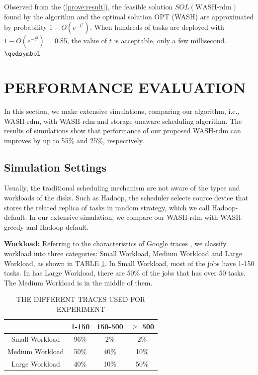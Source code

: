 \documentclass[conference]{IEEEtran}
\begin{document}
Observed from the (\ref{prove:result}), the feasible solution $SOL(\text{WASH-rdm})$ found by the algorithm and the optimal solution OPT (WASH) are approximated by probability $1 - O(e^{-t^2})$. When hundreds of tasks are deployed with $1 - O(e^{-t^2})$ = 0.85, the value of $t$ is acceptable, only a few millisecond.\hfill $\qedsymbol$

\section{PERFORMANCE EVALUATION}\label{PERFORMANCE_EVALUATION}

In this section, we make extensive simulations, comparing our algorithm, i.e., WASH-rdm, with WASH-rdm and storage-unaware scheduling algorithm. The results of simulations show that performance of our proposed WASH-rdm can improves by up to 55\% and 25\%, respectively.
\subsection{Simulation Settings}\label{SCM}
Usually, the traditional scheduling mechanism are not aware of the types and workloads of the disks. Such as Hadoop, the scheduler selects source device that stores the related replica of tasks in random strategy, which we call Hadoop-default. In our extensive simulation, we compare our WASH-rdm with WASH-greedy and Hadoop-default.

\textbf{Workload:} Referring to the characteristics of Google traces \cite{b20}, we classify workload into three categories: Small Workload, Medium Workload and Large Workload, as shown in TABLE \ref{tab:workload}. In Small Workload, most of the jobs have 1-150 tasks. In has Large Workload, there are 50\% of the jobs that has over 50 tasks. The Medium Workload is in the middle of them.

\begin{table}[htbp]
	\caption{THE DIFFERENT TRACES USED FOR EXPERIMENT}
	\begin{center}
		\begin{tabular}{|c|c|c|c|}
			\hline
			 \diagbox{Traces}{Number of tasks} & 1-150 & 150-500 & $\ge$ 500\\
			\hline
			Small Workload & 96\% & 2\% & 2\%\\
			\hline
			Medium Workload & 50\% & 40\% & 10\%\\
			\hline
			Large Workload & 40\% & 10\% & 50\%\\
			\hline
		\end{tabular}
		\label{tab:workload}
	\end{center}
\end{table}
\end{document}
